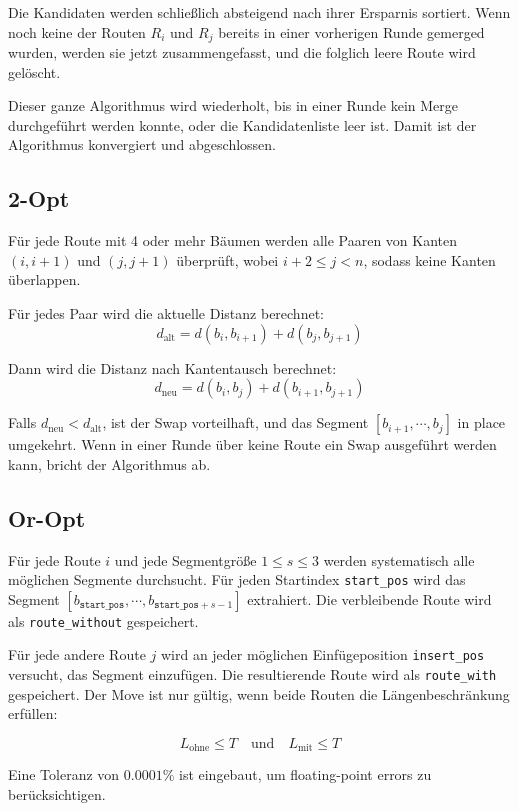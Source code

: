 \documentclass[a4paper,10pt,ngerman]{scrartcl}
\begin{document}
    Die Kandidaten werden schließlich absteigend nach ihrer Ersparnis sortiert. Wenn noch keine der Routen $R_i$ und
    $R_j$ bereits in einer vorherigen Runde gemerged wurden, werden sie jetzt zusammengefasst, und die folglich leere
    Route wird gelöscht.

    Dieser ganze Algorithmus wird wiederholt, bis in einer Runde kein Merge durchgeführt werden konnte, oder die
    Kandidatenliste leer ist. Damit ist der Algorithmus konvergiert und abgeschlossen.

    \subsection{2-Opt}
    Für jede Route mit 4 oder mehr Bäumen werden alle Paaren von Kanten $(i, i+1)$ und $(j, j+1)$ überprüft, wobei
    $i + 2 \leq j < n$, sodass keine Kanten überlappen.

    Für jedes Paar wird die aktuelle Distanz berechnet:
    \[
        d_{\text{alt}} = d(b_i, b_{i+1}) + d(b_j, b_{j+1})
    \]

    Dann wird die Distanz nach Kantentausch berechnet:
    \[
        d_{\text{neu}} = d(b_i, b_j) + d(b_{i+1}, b_{j+1})
    \]

    Falls $d_{\text{neu}} < d_{\text{alt}}$, ist der Swap vorteilhaft, und das Segment $[b_{i+1}, \cdots, b_j]$
    in place umgekehrt. Wenn in einer Runde über keine Route ein Swap ausgeführt werden kann, bricht der Algorithmus ab.

    \subsection{Or-Opt}
    Für jede Route $i$ und jede Segmentgröße $1 \leq s \leq 3$ werden systematisch alle möglichen Segmente durchsucht.
    Für jeden Startindex \texttt{start\_pos} wird das Segment $[b_{\texttt{start\_pos}}, \cdots,
    b_{\texttt{start\_pos}+s-1}]$ extrahiert. Die verbleibende Route wird als \texttt{route\_without} gespeichert.

    Für jede andere Route $j$ wird an jeder möglichen Einfügeposition \texttt{insert\_pos} versucht, das Segment
    einzufügen. Die resultierende Route wird als \texttt{route\_with} gespeichert. Der Move  ist nur gültig, wenn beide
    Routen die Längenbeschränkung erfüllen:

    \[
        L_{\text{ohne}} \leq T \quad \text{und} \quad L_{\text{mit}} \leq T
    \]

    Eine Toleranz von $0.0001\%$ ist eingebaut, um floating-point errors zu berücksichtigen.
\end{document}
